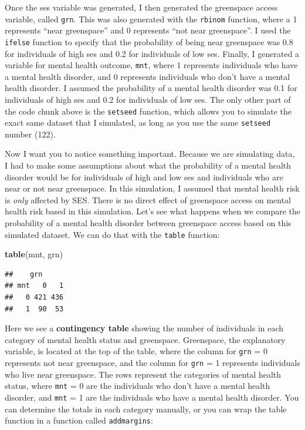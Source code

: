\documentclass[
]{book}
\newenvironment{Shaded}{\begin{snugshade}}{\end{snugshade}}
\newcommand{\FunctionTok}[1]{\textcolor[rgb]{0.13,0.29,0.53}{\textbf{#1}}}
\newcommand{\NormalTok}[1]{#1}
\begin{document}
Once the ses variable was generated, I then generated the greenspace access variable, called \texttt{grn}. This was also generated with the \texttt{rbinom} function, where a 1 represents ``near greenspace'' and 0 represents ``not near greenspace''. I used the \texttt{ifelse} function to specify that the probability of being near greenspace was 0.8 for individuals of high ses and 0.2 for individuals of low ses. Finally, I generated a variable for mental health outcome, \texttt{mnt}, where 1 represents individuals who have a mental health disorder, and 0 represents individuals who don't have a mental health disorder. I assumed the probability of a mental health disorder was 0.1 for individuals of high ses and 0.2 for individuals of low ses. The only other part of the code chunk above is the \texttt{setseed} function, which allows you to simulate the exact same dataset that I simulated, as long as you use the same \texttt{setseed} number (122).

Now I want you to notice something important. Because we are simulating data, I had to make some assumptions about what the probability of a mental health disorder would be for individuals of high and low ses and individuals who are near or not near greenspace. In this simulation, I assumed that mental health risk is \emph{only} affected by SES. There is no direct effect of greenspace access on mental health risk based in this simulation. Let's see what happens when we compare the probability of a mental health disorder between greenspace access based on this simulated dataset. We can do that with the \texttt{table} function:

\begin{Shaded}
\begin{Highlighting}[]
\FunctionTok{table}\NormalTok{(mnt, grn)}
\end{Highlighting}
\end{Shaded}

\begin{verbatim}
##    grn
## mnt   0   1
##   0 421 436
##   1  90  53
\end{verbatim}

Here we see a \textbf{contingency table} showing the number of individuals in each category of mental health status and greenspace. Greenspace, the explanatory variable, is located at the top of the table, where the column for \texttt{grn} = 0 represents not near greenspace, and the column for \texttt{grn} = 1 represents individuals who live near greenspace. The rows represent the categories of mental health status, where \texttt{mnt} = 0 are the individuals who don't have a mental health disorder, and \texttt{mnt} = 1 are the individuals who have a mental health disorder. You can determine the totals in each category manually, or you can wrap the table function in a function called \texttt{addmargins}:
\end{document}
